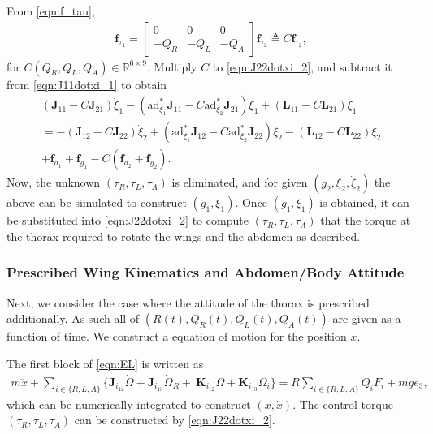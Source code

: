 \documentclass[10pt]{article}
\renewcommand{\Re}{\ensuremath{\mathbb{R}}}
\newcommand{\ad}{\ensuremath{\mathrm{ad}}}
\begin{document}
From \eqref{eqn:f_tau},
\begin{align*}
    \mathbf{f}_{\tau_1} = \begin{bmatrix} 0 & 0 & 0 \\
    -Q_R & -Q_L & -Q_A \end{bmatrix} \mathbf{f}_{\tau_2} 
    \triangleq C \mathbf{f}_{\tau_2},
\end{align*}
for $C(Q_R,Q_L,Q_A)\in\Re^{6\times 9}$. 
Multiply $C$ to \eqref{eqn:J22dotxi_2}, and subtract it from \eqref{eqn:J11dotxi_1} to obtain
\begin{gather}
    (\mathbf{J}_{11}-C\mathbf{J}_{21})\dot \xi_1 -(\ad^*_{\xi_1}\mathbf{J}_{11}-C\ad^*_{\xi_2} \mathbf{J}_{21} )\xi_1 + (\mathbf{L}_{11}-C\mathbf{L}_{21})\xi_1 \nonumber \\ 
=   - (\mathbf{J}_{12}-C\mathbf{J}_{22})\dot \xi_2 +(\ad^*_{\xi_1}\mathbf{J}_{12}-C\ad^*_{\xi_2} \mathbf{J}_{22} )\xi_2 - (\mathbf{L}_{12}-C\mathbf{L}_{22})\xi_2 \nonumber \\ 
+ \mathbf{f}_{a_1}+\mathbf{f}_{g_1}-C(\mathbf{f}_{a_2}+\mathbf{f}_{g_2}).\label{eqn:EL_xR}
\end{gather}
Now, the unknown $(\tau_R,\tau_L,\tau_A)$ is eliminated, and for given $(g_2,\xi_2,\dot\xi_2)$ the above can be simulated to construct $(g_1,\xi_1)$. 
Once $(g_1,\xi_1)$ is obtained, it can be substituted into \eqref{eqn:J22dotxi_2} to compute $(\tau_R,\tau_L,\tau_A)$ that the torque at the thorax required to rotate the wings and the abdomen as described. 

\subsubsection{Prescribed Wing Kinematics and Abdomen/Body Attitude}

Next, we consider the case where the attitude of the thorax is prescribed additionally. 
As such all of $(R(t),Q_R(t),Q_L(t),Q_A(t))$ are given as a function of time.
We construct a equation of motion for the position $x$. 

The first block of \eqref{eqn:EL} is written as
\begin{align}
    m\ddot x + 
    \sum_{i\in\{R,L,A\}} \big\{ \mathbf{J}_{i_{12}} \dot\Omega + \mathbf{J}_{i_{13}}\dot\Omega_R 
    + \ \mathbf{K}_{i_{12}}\Omega + \mathbf{K}_{i_{13}}\Omega_i \big\} = R\sum_{i\in\{R,L,A\}} Q_i F_i + mg e_3,\label{eqn:mx_ddot}
\end{align}
which can be numerically integrated to construct $(x,\dot x)$. 
The control torque $(\tau_R,\tau_L,\tau_A)$ can be constructed by \eqref{eqn:J22dotxi_2}.
\end{document}

